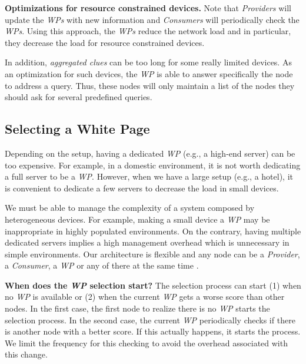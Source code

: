 \noindent\textbf{Optimizations for resource constrained devices.}
Note that \emph{Providers} will update the \emph{WPs} with new information and \emph{Consumers} will periodically check the \emph{WPs}.
Using this approach, the \emph{WPs} reduce the network load and in particular, they decrease the load for resource constrained devices.

In addition, \emph{aggregated clues} can be too long for some really limited devices.
As an optimization for such devices, the \emph{WP} is able to answer specifically the node to address a query.
Thus, these nodes will only maintain a list of the nodes they should ask for several predefined queries.



\subsection{Selecting a White Page}
\label{sec:selection}
Depending on the setup, having a dedicated \emph{WP} (e.g., a high-end server) can be too expensive.
For example, in a domestic environment, it is not worth dedicating a full server to be a \emph{WP}.
However, when we have a large setup (e.g., a hotel), it is convenient to dedicate a few servers to decrease the load in small devices.

We must be able to manage the complexity of a system composed by heterogeneous devices.
For example, making a small device a \emph{WP} may be inappropriate in highly populated environments.
On the contrary, having multiple dedicated servers implies a high management overhead which is unnecessary in simple environments.
Our architecture is flexible and any node can be a \emph{Provider}, a \emph{Consumer}, a \emph{WP} or any of there at the same time \citep{larrea2012specifying}.

\noindent\textbf{When does the \emph{WP} selection start?}
The selection process can start (1) when no \emph{WP} is available or (2) when the current \emph{WP} gets a worse score than other nodes.
In the first case, the first node to realize there is no \emph{WP} starts the selection process.
In the second case, the current \emph{WP} periodically checks if there is another node with a better score.
If this actually happens, it starts the process.
We limit the frequency for this checking to avoid the overhead associated with this change.

